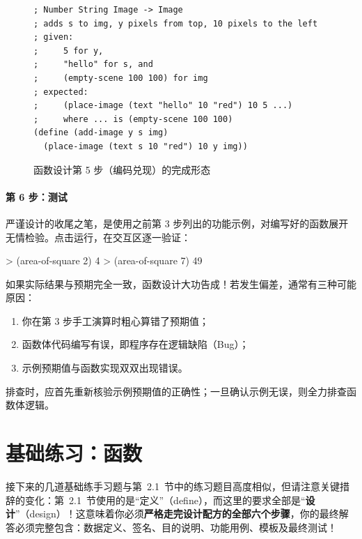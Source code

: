 \begin{figure}[htbp]
  \centering
\begin{lstlisting}[language=BSL, basicstyle=\scriptsize\ttfamily]
; Number String Image -> Image
; adds s to img, y pixels from top, 10 pixels to the left
; given:
;     5 for y,
;     "hello" for s, and
;     (empty-scene 100 100) for img
; expected:
;     (place-image (text "hello" 10 "red") 10 5 ...)
;     where ... is (empty-scene 100 100)
(define (add-image y s img)
  (place-image (text s 10 "red") 10 y img))
\end{lstlisting}
  \caption{函数设计第 5 步（编码兑现）的完成形态}
  \label{fig:ch03_step5}
\end{figure}

\paragraph{第 6 步：测试}
严谨设计的收尾之笔，是使用之前第 3 步列出的功能示例，对编写好的函数展开无情检验。点击运行，在交互区逐一验证：
\begin{replbox}
> (area-of-square 2)
4
> (area-of-square 7)
49
\end{replbox}

如果实际结果与预期完全一致，函数设计大功告成！若发生偏差，通常有三种可能原因：
\begin{enumerate}[label=(\alph*)]
  \item 你在第 3 步手工演算时粗心算错了预期值；
  \item 函数体代码编写有误，即程序存在逻辑缺陷（Bug）；
  \item 示例预期值与函数实现双双出现错误。
\end{enumerate}
排查时，应首先重新核验示例预期值的正确性；一旦确认示例无误，则全力排查函数体逻辑。


\section{基础练习：函数}
\label{sec:3.2}

接下来的几道基础练手习题与第~2.1~节中的练习题目高度相似，但请注意关键措辞的变化：第~2.1~节使用的是“定义”（define），而这里的要求全部是“\textbf{设计}”（design）！这意味着你必须\textbf{严格走完设计配方的全部六个步骤}，你的最终解答必须完整包含：数据定义、签名、目的说明、功能用例、模板及最终测试！

